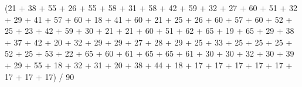 \documentclass[
  letterpaper,
  DIV=11,
  numbers=noendperiod]{scrreprt}
\newenvironment{Shaded}{\begin{snugshade}}{\end{snugshade}}
\newcommand{\DecValTok}[1]{\textcolor[rgb]{0.68,0.00,0.00}{#1}}
\newcommand{\NormalTok}[1]{\textcolor[rgb]{0.00,0.23,0.31}{#1}}
\newcommand{\SpecialCharTok}[1]{\textcolor[rgb]{0.37,0.37,0.37}{#1}}
\begin{document}
\begin{Shaded}
\begin{Highlighting}[]
\NormalTok{(}\DecValTok{21} \SpecialCharTok{+} \DecValTok{38} \SpecialCharTok{+} \DecValTok{55} \SpecialCharTok{+} \DecValTok{26} \SpecialCharTok{+} \DecValTok{55} \SpecialCharTok{+} \DecValTok{58} \SpecialCharTok{+} \DecValTok{31} \SpecialCharTok{+} \DecValTok{58} \SpecialCharTok{+} \DecValTok{42} \SpecialCharTok{+} \DecValTok{59} \SpecialCharTok{+} \DecValTok{32} \SpecialCharTok{+} \DecValTok{27} \SpecialCharTok{+} \DecValTok{60} \SpecialCharTok{+} \DecValTok{51} \SpecialCharTok{+} \DecValTok{32} \SpecialCharTok{+} \DecValTok{29} \SpecialCharTok{+} \DecValTok{41} \SpecialCharTok{+} \DecValTok{57} \SpecialCharTok{+} \DecValTok{60} \SpecialCharTok{+} \DecValTok{18} \SpecialCharTok{+} \DecValTok{41} \SpecialCharTok{+} \DecValTok{60} \SpecialCharTok{+} \DecValTok{21} \SpecialCharTok{+} \DecValTok{25} \SpecialCharTok{+} \DecValTok{26} \SpecialCharTok{+} \DecValTok{60} \SpecialCharTok{+} \DecValTok{57} \SpecialCharTok{+} \DecValTok{60} \SpecialCharTok{+} \DecValTok{52} \SpecialCharTok{+} \DecValTok{25} \SpecialCharTok{+} \DecValTok{23} \SpecialCharTok{+} \DecValTok{42} \SpecialCharTok{+} \DecValTok{59} \SpecialCharTok{+} \DecValTok{30} \SpecialCharTok{+} \DecValTok{21} \SpecialCharTok{+} \DecValTok{21} \SpecialCharTok{+} \DecValTok{60} \SpecialCharTok{+} \DecValTok{51} \SpecialCharTok{+} \DecValTok{62} \SpecialCharTok{+} \DecValTok{65} \SpecialCharTok{+} \DecValTok{19} \SpecialCharTok{+} \DecValTok{65} \SpecialCharTok{+} \DecValTok{29} \SpecialCharTok{+} \DecValTok{38} \SpecialCharTok{+} \DecValTok{37} \SpecialCharTok{+} \DecValTok{42} \SpecialCharTok{+} \DecValTok{20} \SpecialCharTok{+} \DecValTok{32} \SpecialCharTok{+} \DecValTok{29} \SpecialCharTok{+} \DecValTok{29} \SpecialCharTok{+} \DecValTok{27} \SpecialCharTok{+} \DecValTok{28} \SpecialCharTok{+} \DecValTok{29} \SpecialCharTok{+} \DecValTok{25} \SpecialCharTok{+} \DecValTok{33} \SpecialCharTok{+} \DecValTok{25} \SpecialCharTok{+} \DecValTok{25} \SpecialCharTok{+} \DecValTok{25} \SpecialCharTok{+} \DecValTok{52} \SpecialCharTok{+} \DecValTok{25} \SpecialCharTok{+} \DecValTok{53} \SpecialCharTok{+} \DecValTok{22} \SpecialCharTok{+} \DecValTok{65} \SpecialCharTok{+} \DecValTok{60} \SpecialCharTok{+} \DecValTok{61} \SpecialCharTok{+} \DecValTok{65} \SpecialCharTok{+} \DecValTok{65} \SpecialCharTok{+} \DecValTok{61} \SpecialCharTok{+} \DecValTok{30} \SpecialCharTok{+} \DecValTok{30} \SpecialCharTok{+} \DecValTok{32} \SpecialCharTok{+} \DecValTok{30} \SpecialCharTok{+} \DecValTok{39} \SpecialCharTok{+} \DecValTok{29} \SpecialCharTok{+} \DecValTok{55} \SpecialCharTok{+} \DecValTok{18} \SpecialCharTok{+} \DecValTok{32} \SpecialCharTok{+} \DecValTok{31} \SpecialCharTok{+} \DecValTok{20} \SpecialCharTok{+} \DecValTok{38} \SpecialCharTok{+} \DecValTok{44} \SpecialCharTok{+} \DecValTok{18} \SpecialCharTok{+} \DecValTok{17} \SpecialCharTok{+} \DecValTok{17} \SpecialCharTok{+} \DecValTok{17} \SpecialCharTok{+} \DecValTok{17} \SpecialCharTok{+} \DecValTok{17} \SpecialCharTok{+} \DecValTok{17} \SpecialCharTok{+} \DecValTok{17} \SpecialCharTok{+} \DecValTok{17}\NormalTok{) }\SpecialCharTok{/} \DecValTok{90}
\end{Highlighting}
\end{Shaded}
\end{document}
